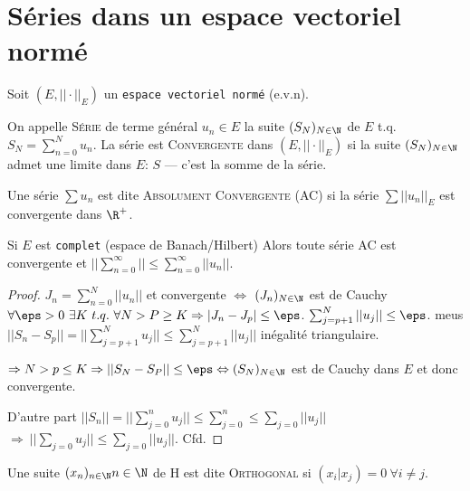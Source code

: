 \section{Séries dans un espace vectoriel normé} %

Soit $(E, ||\cdot||_E)$ un \texttt{espace vectoriel normé} (e.v.n).
\begin{definition}
	On appelle \textsc{Série} de terme général $u_n\in E$ la suite $(S_N)_{N\in \N}$ de $E$ t.q.  $S_N=\sum\limits_{n=0}^Nu_n$.
	La série est \textsc{Convergente} dans $(E, ||\cdot||_E)$ si la suite $(S_N)_{N\in\N}$ admet une limite dans $E$: $S$ --- c'est la somme de la série.
\end{definition}



\begin{definition}
	Une série $\sum u_n$ est dite \textsc{Absolument Convergente} (AC) si la série $\sum ||u_n||_E$ est convergente dans $\R^+$.
\end{definition}

\begin{theorem}
	Si $E$ est \texttt{complet} (espace de Banach/Hilbert) Alors toute série AC est convergente et $||\sum\limits_{n=0}^\infty||\leq \sum\limits_{n=0}^\infty||u_n||$.
\end{theorem}
\begin{proof}
	$J_n=\sum\limits_{n=0}^N||u_n||$ et convergente $\Leftrightarrow$ $(J_n)_{N\in\N}$ est de Cauchy $\forall \eps >0\ \exists K\ t.q.\ \forall N>P\geq K\Rightarrow |J_n-J_p|\leq \eps$. $\sum_{j=p+1}^N||u_j||\leq \eps$. meus $||S_n-S_p||=||\sum_{j=p+1}^Nu_j||\leq\sum_{j=p+1}^N ||u_j||$ inégalité triangulaire.
	
	$\Rightarrow N>p\leq K\Rightarrow ||S_N-S_P||\leq \eps \Leftrightarrow (S_N)_{N\in \N}$ est de Cauchy dans $E$ et donc convergente.
	
	D'autre part $||S_n||=||\sum_{j=0}^n u_j||\leq\sum_{j=0}^n\leq \sum_{j=0}||u_j||$ $\Rightarrow\ ||\sum_{j=0}u_j||\leq \sum_{j=0}||u_j||$. Cfd.
\end{proof}

\begin{definition}

	Une suite $(x_n)_{n\in\N}{n\in \N}$ de H est dite \textsc{Orthogonal} si $(x_i|x_j)=0\ \forall i≠j$.
\end{definition}

